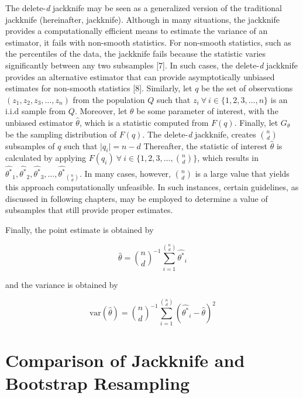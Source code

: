 \documentclass[
  letterpaper,
  DIV=11,
  numbers=noendperiod]{scrreprt}
\begin{document}
The delete-\emph{d} jackknife may be seen as a generalized version of
the traditional jackknife (hereinafter, jackknife). Although in many
situations, the jackknife provides a computationally efficient means to
estimate the variance of an estimator, it fails with non-smooth
statistics. For non-smooth statistics, such as the percentiles of the
data, the jackknife fails because the statistic varies significantly
between any two subsamples {[}7{]}. In such cases, the delete-\emph{d}
jackknife provides an alternative estimator that can provide
asymptotically unbiased estimates for non-smooth statistics {[}8{]}.
Similarly, let \(q\) be the set of observations
\(\left(z_1, z_2, z_3, \dots, z_n \right)\) from the population \(Q\)
such that \(z_i \ \forall \ i \in \{1, 2, 3, \dots, n\}\) is an i.i.d
sample from \(Q\). Moreover, let \(\theta\) be some parameter of
interest, with the unbiased estimator \(\hat{\theta}\), which is a
statistic computed from \(F(q)\). Finally, let \(G_{\theta}\) be the
sampling distribution of \(F(q)\). The delete-\emph{d} jackknife,
creates \(n \choose d\) subsamples of \(q\) such that
\(\lvert q_i \rvert = n-d\) Thereafter, the statistic of interest
\(\hat{\theta}\) is calculated by applying
\(F(q_i) \ \forall \ i \in \{1, 2, 3, \dots, {n \choose d} \}\), which
results in
\(\hat{\theta^*}_1, \hat{\theta^*}_2, \hat{\theta^*}_3, \dots, \hat{\theta^*}_{n \choose d}\).
In many cases, however, \(n \choose d\) is a large value that yields
this approach computationally unfeasible. In such instances, certain
guidelines, as discussed in following chapters, may be employed to
determine a value of subsamples that still provide proper estimates.

Finally, the point estimate is obtained by

\[ 
\hat{\theta} = {n \choose d}^{-1}\sum^{n \choose d}_{i = 1} \hat{\theta^*}_i
\]

and the variance is obtained by

\[
\text{var}(\hat{\theta}) = {n \choose d}^{-1}\sum^{n \choose d}_{i = 1} \left(\hat{\theta^*}_i - \hat{\theta}\right)^2
\]

\hypertarget{comparison-of-jackknife-and-bootstrap-resampling}{%
\section{Comparison of Jackknife and Bootstrap
Resampling}\label{comparison-of-jackknife-and-bootstrap-resampling}}
\end{document}
